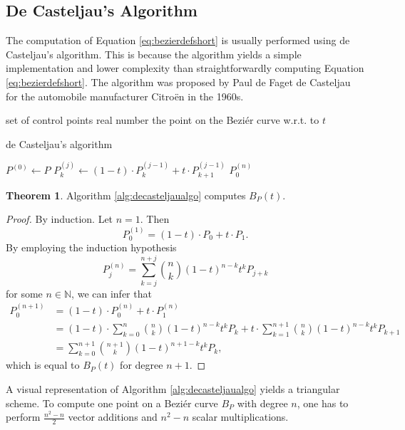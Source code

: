 \documentclass[a4paper, 11pt]{report}
\theoremstyle{definition}
\newtheorem{theorem}[definition]{Theorem}
\newcommand{\Desc}[2]{\State \makebox[12em][l]{#1}#2}
\begin{document}
\subsection{De Casteljau's Algorithm}
	The computation of Equation \ref{eq:bezierdefshort} is usually performed using de Casteljau's algorithm. This is because the algorithm yields a simple implementation and lower complexity than straightforwardly computing Equation \ref{eq:bezierdefshort}. The algorithm was proposed by Paul de Faget de Casteljau for the automobile manufacturer Citroën in the 1960s.

	\begin{algorithm}[H]
		\begin{algorithmic}[1]
			\Input
				\Desc{$P = \{P_0, P_1, ..., P_n\}$}{set of control points}
				\Desc{$t$}{real number}
			\EndInput
			\Output
				\Desc{$P^{(n)}_0 = B_P(t)$}{the point on the Beziér curve w.r.t. to $t$}
			\EndOutput

			\caption{de Casteljau's algorithm}\label{alg:decasteljaualgo}
				\State $P^{(0)} \gets P$
						\State $P^{(j)}_k \gets (1-t) \cdot P^{(j-1)}_k + t \cdot P^{(j-1)}_{k+1}$
					\EndFor
				\EndFor
				\Return $P^{(n)}_0$
			\EndProcedure
		\end{algorithmic}
	\end{algorithm}

	\begin{theorem}
		Algorithm \ref{alg:decasteljaualgo} computes $B_P(t)$.
	\end{theorem}
	\begin{proof}
		By induction. Let $n = 1$. Then
			$$ P_0^{(1)} = (1-t) \cdot P_0 + t \cdot P_1.$$
		By employing the induction hypothesis
			$$ P_j^{(n)} = \sum_{k=j}^{n+j} \binom{n}{k} (1-t)^{n-k}t^k P_{j+k}$$
		for some $n \in \mathbb{N}$, we can infer that
		\begin{align*}
			P_0^{(n+1)}	&= (1-t) \cdot P_0^{(n)} + t \cdot P_1^{(n)} \\
						&= (1-t) \cdot \sum_{k=0}^{n} \binom{n}{k} (1-t)^{n-k}t^k P_{k} + t \cdot \sum_{k=1}^{n+1} \binom{n}{k} (1-t)^{n-k}t^k P_{k+1} \\
						&= \sum_{k=0}^{n+1} \binom{n+1}{k} (1-t)^{n+1-k}t^k P_{k},
		\end{align*}
		which is equal to $B_P(t)$ for degree $n+1$.
	\end{proof}

	A visual representation of Algorithm \ref{alg:decasteljaualgo} yields a triangular scheme. To compute one point on a Beziér curve $B_P$ with degree $n$, one has to perform $\frac{n^2-n}{2}$ vector additions and $n^2-n$ scalar multiplications.
\end{document}
